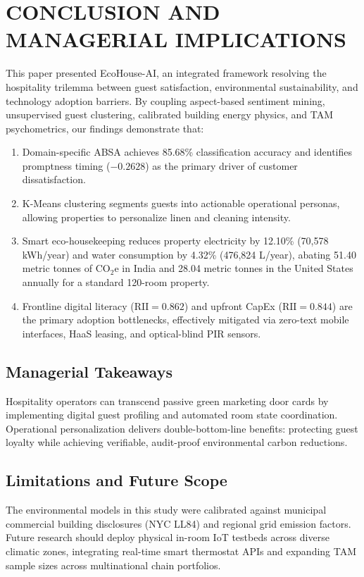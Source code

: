 \documentclass[11pt,a4paper]{article}
\begin{document}
\section{CONCLUSION AND MANAGERIAL IMPLICATIONS}

This paper presented EcoHouse-AI, an integrated framework resolving the hospitality trilemma between guest satisfaction, environmental sustainability, and technology adoption barriers. By coupling aspect-based sentiment mining, unsupervised guest clustering, calibrated building energy physics, and TAM psychometrics, our findings demonstrate that:
\begin{enumerate}
    \item Domain-specific ABSA achieves 85.68\% classification accuracy and identifies promptness timing ($-0.2628$) as the primary driver of customer dissatisfaction.
    \item K-Means clustering segments guests into actionable operational personas, allowing properties to personalize linen and cleaning intensity.
    \item Smart eco-housekeeping reduces property electricity by 12.10\% (70,578 kWh/year) and water consumption by 4.32\% (476,824 L/year), abating 51.40 metric tonnes of $\text{CO}_2\text{e}$ in India and 28.04 metric tonnes in the United States annually for a standard 120-room property.
    \item Frontline digital literacy ($\text{RII} = 0.862$) and upfront CapEx ($\text{RII} = 0.844$) are the primary adoption bottlenecks, effectively mitigated via zero-text mobile interfaces, HaaS leasing, and optical-blind PIR sensors.
\end{enumerate}

\subsection{Managerial Takeaways}
Hospitality operators can transcend passive green marketing door cards by implementing digital guest profiling and automated room state coordination. Operational personalization delivers double-bottom-line benefits: protecting guest loyalty while achieving verifiable, audit-proof environmental carbon reductions.

\subsection{Limitations and Future Scope}
The environmental models in this study were calibrated against municipal commercial building disclosures (NYC LL84) and regional grid emission factors. Future research should deploy physical in-room IoT testbeds across diverse climatic zones, integrating real-time smart thermostat APIs and expanding TAM sample sizes across multinational chain portfolios.
\end{document}
